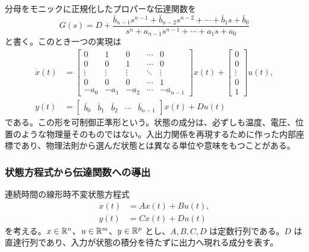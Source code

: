 分母をモニックに正規化したプロパーな伝達関数を
\begin{equation}
  G(s)=D+\frac{\bar{b}_{n-1}s^{n-1}+\bar{b}_{n-2}s^{n-2}+\cdots+\bar{b}_1s+\bar{b}_0}
  {s^n+a_{n-1}s^{n-1}+\cdots+a_1s+a_0}
  \label{eq:proper-transfer-realization-source}
\end{equation}
と書く。このとき一つの実現は
\begin{align}
  \dot{x}(t)
  &=
  \begin{bmatrix}
    0&1&0&\cdots&0\\
    0&0&1&\cdots&0\\
    \vdots&\vdots&\vdots&\ddots&\vdots\\
    0&0&0&\cdots&1\\
    -a_0&-a_1&-a_2&\cdots&-a_{n-1}
  \end{bmatrix}x(t)
  +\begin{bmatrix}
    0\\
    0\\
    \vdots\\
    0\\
    1
  \end{bmatrix}u(t),\label{eq:controllable-canonical-realization}\\
  y(t)&=
  \begin{bmatrix}
    \bar{b}_0&\bar{b}_1&\bar{b}_2&\cdots&\bar{b}_{n-1}
  \end{bmatrix}x(t)+Du(t)
\end{align}
である。この形を可制御正準形という。状態の成分は、必ずしも温度、電圧、位置のような物理量そのものではない。入出力関係を再現するために作った内部座標であり、物理法則から選んだ状態とは異なる単位や意味をもつことがある。

\subsubsection{状態方程式から伝達関数への導出}

連続時間の線形時不変状態方程式
\begin{align}
  \dot{x}(t)&=Ax(t)+Bu(t),\label{eq:ss-to-tf-state}\\
  y(t)&=Cx(t)+Du(t)\label{eq:ss-to-tf-output}
\end{align}
を考える。$x\in\mathbb{R}^n$、$u\in\mathbb{R}^m$、$y\in\mathbb{R}^p$ とし、$A,B,C,D$ は定数行列である。$D$ は直達行列であり、入力が状態の積分を待たずに出力へ現れる成分を表す。

